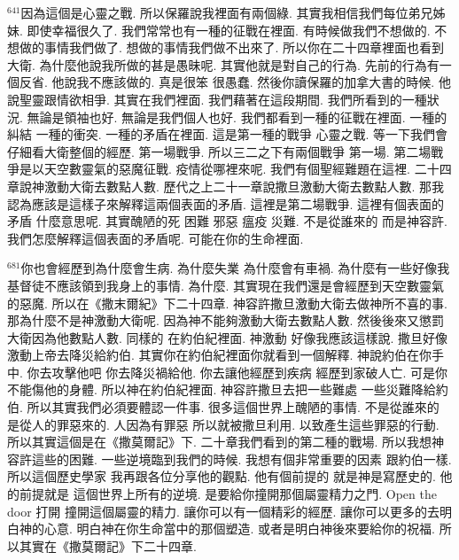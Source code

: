 \documentclass{book}
\begin{document}
$^{641}$因為這個是心靈之戰.
所以保羅說我裡面有兩個綠.
其實我相信我們每位弟兄姊妹.
即使幸福很久了.
我們常常也有一種的征戰在裡面.
有時候做我們不想做的.
不想做的事情我們做了.
想做的事情我們做不出來了.
所以你在二十四章裡面也看到大衛.
為什麼他說我所做的甚是愚昧呢.
其實他就是對自己的行為.
先前的行為有一個反省.
他說我不應該做的.
真是很笨 很愚蠢.
然後你讀保羅的加拿大書的時候.
他說聖靈跟情欲相爭.
其實在我們裡面.
我們藉著在這段期間.
我們所看到的一種狀況.
無論是領袖也好.
無論是我們個人也好.
我們都看到一種的征戰在裡面.
一種的糾結 一種的衝突.
一種的矛盾在裡面.
這是第一種的戰爭 心靈之戰.
等一下我們會仔細看大衛整個的經歷.
第一場戰爭.
所以三二之下有兩個戰爭 第一場.
第二場戰爭是以天空數靈氣的惡魔征戰.
疫情從哪裡來呢.
我們有個聖經難題在這裡.
二十四章說神激動大衛去數點人數.
歷代之上二十一章說撒旦激動大衛去數點人數.
那我認為應該是這樣子來解釋這兩個表面的矛盾.
這裡是第二場戰爭.
這裡有個表面的矛盾 什麼意思呢.
其實醜陋的死 困難 邪惡 瘟疫 災難.
不是從誰來的 而是神容許.
我們怎麼解釋這個表面的矛盾呢.
可能在你的生命裡面.

$^{681}$你也會經歷到為什麼會生病.
為什麼失業 為什麼會有車禍.
為什麼有一些好像我基督徒不應該領到我身上的事情.
為什麼.
其實現在我們還是會經歷到天空數靈氣的惡魔.
所以在《撒末爾紀》下二十四章.
神容許撒旦激動大衛去做神所不喜的事.
那為什麼不是神激動大衛呢.
因為神不能夠激動大衛去數點人數.
然後後來又懲罰大衛因為他數點人數.
同樣的 在約伯紀裡面.
神激動 好像我應該這樣說.
撒旦好像激動上帝去降災給約伯.
其實你在約伯紀裡面你就看到一個解釋.
神說約伯在你手中.
你去攻擊他吧 你去降災禍給他.
你去讓他經歷到疾病 經歷到家破人亡.
可是你不能傷他的身體.
所以神在約伯紀裡面.
神容許撒旦去把一些難處 一些災難降給約伯.
所以其實我們必須要體認一件事.
很多這個世界上醜陋的事情.
不是從誰來的 是從人的罪惡來的.
人因為有罪惡 所以就被撒旦利用.
以致產生這些罪惡的行動.
所以其實這個是在《撒莫爾記》下.
二十章我們看到的第二種的戰場.
所以我想神容許這些的困難.
一些逆境臨到我們的時候.
我想有個非常重要的因素 跟約伯一樣.
所以這個歷史學家 我再跟各位分享他的觀點.
他有個前提的 就是神是寫歷史的.
他的前提就是 這個世界上所有的逆境.
是要給你撞開那個屬靈精力之門.
Open the door 打開 撞開這個屬靈的精力.
讓你可以有一個精彩的經歷.
讓你可以更多的去明白神的心意.
明白神在你生命當中的那個塑造.
或者是明白神後來要給你的祝福.
所以其實在《撒莫爾記》下二十四章.
\end{document}
